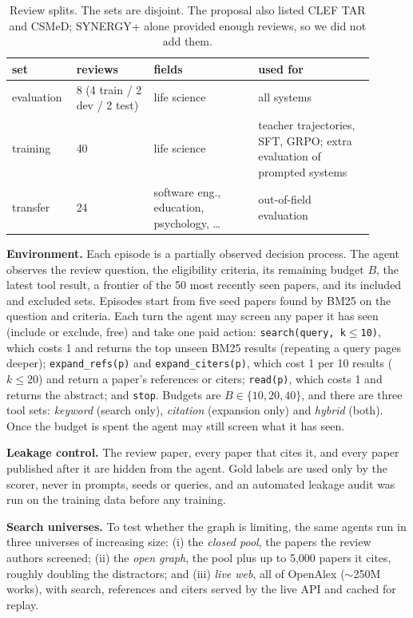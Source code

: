 \documentclass{article} %
\begin{document}
\begin{table}[h]
\centering
\small
\begin{tabular}{@{}p{0.13\linewidth}p{0.2\linewidth}p{0.27\linewidth}p{0.30\linewidth}@{}}
\toprule
set & reviews & fields & used for \\
\midrule
evaluation & 8 (4 train / 2 dev / 2 test) & life science & all systems \\
training & 40 & life science & teacher trajectories, SFT, GRPO; extra evaluation of prompted systems \\
transfer & 24 & software eng., education, psychology, \dots & out-of-field evaluation \\
\bottomrule
\end{tabular}
\caption{Review splits. The sets are disjoint. The proposal also listed CLEF TAR and CSMeD;
SYNERGY+ alone provided enough reviews, so we did not add them.}
\label{tab:splits}
\end{table}

\textbf{Environment.} Each episode is a partially observed decision process. The agent observes
the review question, the eligibility criteria, its remaining budget $B$, the latest tool result,
a frontier of the 50 most recently seen papers, and its included and excluded sets. Episodes start
from five seed papers found by BM25 \citep{robertson2009bm25} on the question and criteria. Each
turn the agent may screen any paper it has seen (include or exclude, free) and take one paid
action:
\texttt{search(query, k$\le$10)}, which costs 1 and returns the top unseen BM25 results (repeating
a query pages deeper);
\texttt{expand\_refs(p)} and \texttt{expand\_citers(p)}, which cost 1 per 10 results ($k\le 20$)
and return a paper's references or citers;
\texttt{read(p)}, which costs 1 and returns the abstract; and \texttt{stop}. Budgets are
$B\in\{10, 20, 40\}$, and there are three tool sets: \emph{keyword} (search only),
\emph{citation} (expansion only) and \emph{hybrid} (both). Once the budget is spent the agent may
still screen what it has seen.

\textbf{Leakage control.} The review paper, every paper that cites it, and every paper published
after it are hidden from the agent. Gold labels are used only by the scorer, never in prompts,
seeds or queries, and an automated leakage audit was run on the training data before any training.

\textbf{Search universes.} To test whether the graph is limiting, the same agents run in three
universes of increasing size:
(i) the \emph{closed pool}, the papers the review authors screened;
(ii) the \emph{open graph}, the pool plus up to 5{,}000 papers it cites, roughly doubling the
distractors; and
(iii) \emph{live web}, all of OpenAlex ($\sim$250M works), with search, references and citers
served by the live API and cached for replay.
\end{document}
